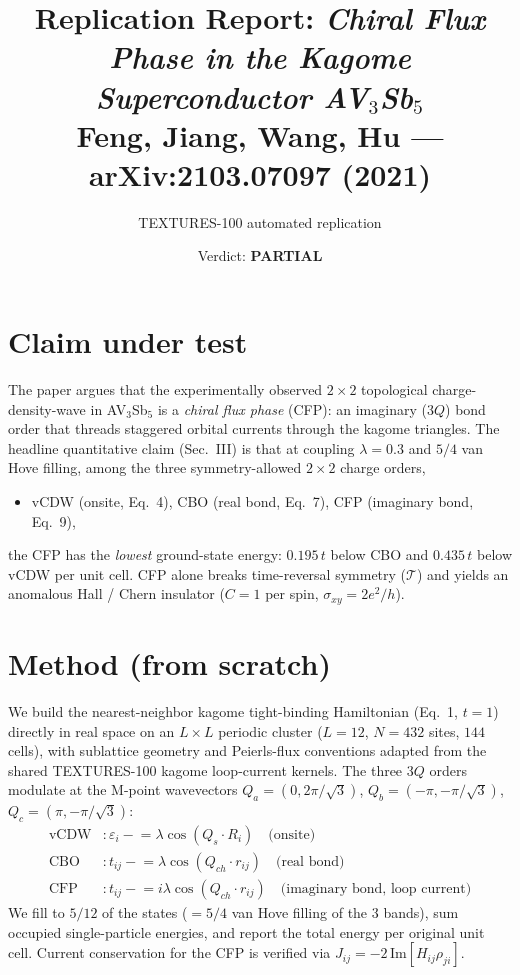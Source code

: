 \documentclass[11pt]{article}
\title{Replication Report: \emph{Chiral Flux Phase in the Kagome Superconductor AV$_3$Sb$_5$}\\
\large Feng, Jiang, Wang, Hu --- arXiv:2103.07097 (2021)}
\author{TEXTURES-100 automated replication}
\date{Verdict: \textbf{PARTIAL}}
\begin{document}
\maketitle

\section{Claim under test}
The paper argues that the experimentally observed $2\times2$ topological charge-density-wave
in AV$_3$Sb$_5$ is a \emph{chiral flux phase} (CFP): an imaginary ($3Q$) bond order that
threads staggered orbital currents through the kagome triangles. The headline quantitative
claim (Sec.~III) is that at coupling $\lambda=0.3$ and $5/4$ van Hove filling, among the three
symmetry-allowed $2\times2$ charge orders,
\begin{itemize}
  \item vCDW (onsite, Eq.~4), \quad CBO (real bond, Eq.~7), \quad CFP (imaginary bond, Eq.~9),
\end{itemize}
the CFP has the \emph{lowest} ground-state energy: $0.195\,t$ below CBO and $0.435\,t$ below
vCDW per unit cell. CFP alone breaks time-reversal symmetry ($\mathcal{T}$) and yields an
anomalous Hall / Chern insulator ($C=1$ per spin, $\sigma_{xy}=2e^2/h$).

\section{Method (from scratch)}
We build the nearest-neighbor kagome tight-binding Hamiltonian (Eq.~1, $t=1$) directly in
real space on an $L\times L$ periodic cluster ($L=12$, $N=432$ sites, $144$ cells), with
sublattice geometry and Peierls-flux conventions adapted from the shared TEXTURES-100
kagome loop-current kernels. The three $3Q$ orders modulate at the M-point wavevectors
$Q_a=(0,2\pi/\sqrt3)$, $Q_b=(-\pi,-\pi/\sqrt3)$, $Q_c=(\pi,-\pi/\sqrt3)$:
\begin{align*}
\text{vCDW}&: \varepsilon_i \mathrel{-}= \lambda\cos(Q_{s}\!\cdot\!R_i) \quad\text{(onsite)}\\
\text{CBO} &: t_{ij}\mathrel{-}= \lambda\cos(Q_{ch}\!\cdot\!r_{ij}) \quad\text{(real bond)}\\
\text{CFP} &: t_{ij}\mathrel{-}= i\lambda\cos(Q_{ch}\!\cdot\!r_{ij}) \quad\text{(imaginary bond, loop current)}
\end{align*}
We fill to $5/12$ of the states ($=5/4$ van Hove filling of the 3 bands), sum occupied
single-particle energies, and report the total energy per original unit cell. Current
conservation for the CFP is verified via $J_{ij}=-2\,\mathrm{Im}[H_{ij}\rho_{ji}]$.
\end{document}
